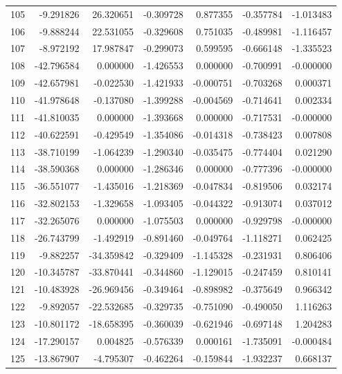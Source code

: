 \begin{tabular}{rrrrrrr}
105 &  -9.291826 &   26.320651 & -0.309728 &   0.877355 &  -0.357784 & -1.013483 \\
106 &  -9.888244 &   22.531055 & -0.329608 &   0.751035 &  -0.489981 & -1.116457 \\
107 &  -8.972192 &   17.987847 & -0.299073 &   0.599595 &  -0.666148 & -1.335523 \\
108 & -42.796584 &    0.000000 & -1.426553 &   0.000000 &  -0.700991 & -0.000000 \\
109 & -42.657981 &   -0.022530 & -1.421933 &  -0.000751 &  -0.703268 &  0.000371 \\
110 & -41.978648 &   -0.137080 & -1.399288 &  -0.004569 &  -0.714641 &  0.002334 \\
111 & -41.810035 &    0.000000 & -1.393668 &   0.000000 &  -0.717531 & -0.000000 \\
112 & -40.622591 &   -0.429549 & -1.354086 &  -0.014318 &  -0.738423 &  0.007808 \\
113 & -38.710199 &   -1.064239 & -1.290340 &  -0.035475 &  -0.774404 &  0.021290 \\
114 & -38.590368 &    0.000000 & -1.286346 &   0.000000 &  -0.777396 & -0.000000 \\
115 & -36.551077 &   -1.435016 & -1.218369 &  -0.047834 &  -0.819506 &  0.032174 \\
116 & -32.802153 &   -1.329658 & -1.093405 &  -0.044322 &  -0.913074 &  0.037012 \\
117 & -32.265076 &    0.000000 & -1.075503 &   0.000000 &  -0.929798 & -0.000000 \\
118 & -26.743799 &   -1.492919 & -0.891460 &  -0.049764 &  -1.118271 &  0.062425 \\
119 &  -9.882257 &  -34.359842 & -0.329409 &  -1.145328 &  -0.231931 &  0.806406 \\
120 & -10.345787 &  -33.870441 & -0.344860 &  -1.129015 &  -0.247459 &  0.810141 \\
121 & -10.483928 &  -26.969456 & -0.349464 &  -0.898982 &  -0.375649 &  0.966342 \\
122 &  -9.892057 &  -22.532685 & -0.329735 &  -0.751090 &  -0.490050 &  1.116263 \\
123 & -10.801172 &  -18.658395 & -0.360039 &  -0.621946 &  -0.697148 &  1.204283 \\
124 & -17.290157 &    0.004825 & -0.576339 &   0.000161 &  -1.735091 & -0.000484 \\
125 & -13.867907 &   -4.795307 & -0.462264 &  -0.159844 &  -1.932237 &  0.668137 \\

\end{tabular}
